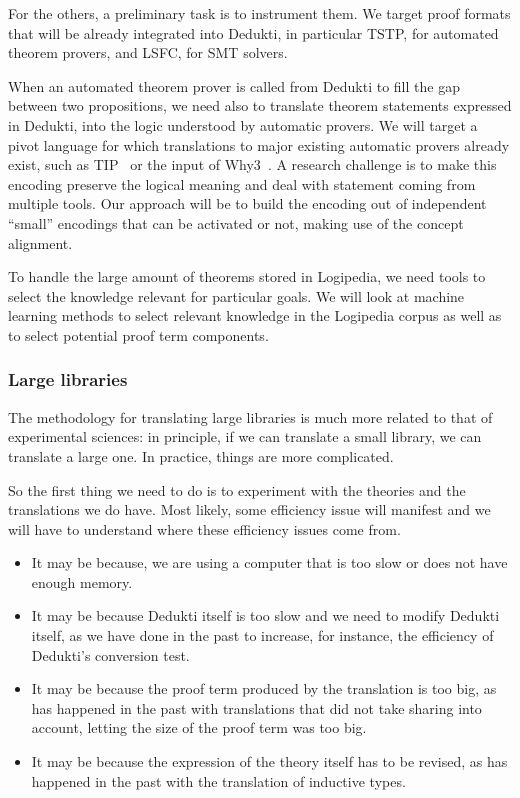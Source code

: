 For the others, a preliminary task is to instrument them.  We target
proof formats that will be already integrated into Dedukti, in
particular TSTP, for automated theorem provers, and LSFC, for SMT solvers.

When an automated theorem prover is called from Dedukti to fill the
gap between two propositions, we need also to translate theorem
statements expressed in Dedukti, into the logic understood by
automatic provers. We will target a pivot language for which
translations to major existing automatic provers already exist, such
as TIP~\cite{DBLP:conf/mkm/ClaessenJRS15} or the input of
Why3~\cite{DBLP:conf/esop/FilliatreP13}. A research challenge is to
make this encoding preserve the logical meaning and deal with
statement coming from multiple tools. Our approach will be to build
the encoding out of independent ``small'' encodings that can be
activated or not, making use of the concept alignment.

To handle the large amount of theorems stored in Logipedia, we need
tools to select the knowledge relevant for particular goals. We will
look at machine learning methods to select relevant knowledge in the
Logipedia corpus as well as to select potential proof term components.

\subsubsection*{Large libraries}

The methodology for translating large libraries is much more related
to that of experimental sciences: in principle, if we can translate a
small library, we can translate a large one. In practice, things are
more complicated.

So the first thing we need to do is to experiment with the theories
and the translations we do have. Most likely, some efficiency issue
will manifest and we will have to understand where these efficiency
issues come from.

\begin{itemize}
\item It may be because, we are using a computer that is too slow or
  does not have enough memory.
\item It may be because Dedukti itself is too slow and we need to modify
  Dedukti itself, as we have done in the past to increase, for instance,
  the efficiency of Dedukti's conversion test.
\item It may be because the proof term produced by the translation is
  too big, as has happened in the past with translations that did not
  take sharing into account, letting the size of the proof term 
  was too big.
\item It may be because the expression of the theory itself has to be
  revised, as has happened in the past with the translation of
  inductive types.
\end{itemize}

